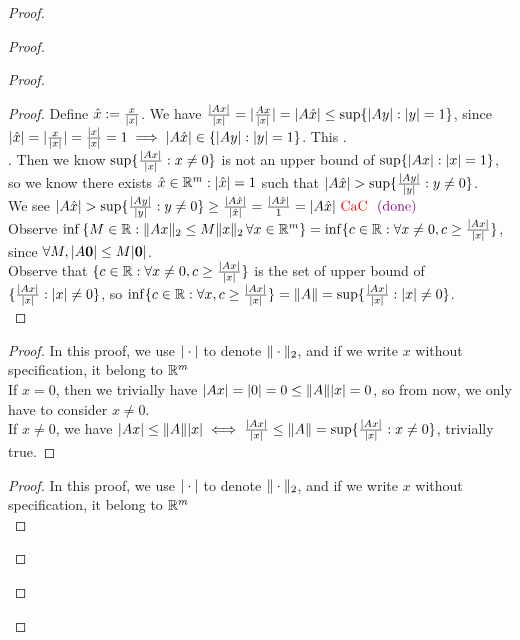 \documentclass{report}
\begin{document}
\begin{proof}
\begin{proof}
\begin{proof}
\begin{proof}
Define $\hat{x}:=\frac{x}{|x|}$. We have $\frac{|Ax|}{|x|}=|\frac{Ax}{|x|}|=|A \hat{x}|\leq \sup \{ |Ay|:|y|=1 \}
$, since $|\hat{x}|=|\frac{x}{|x|}|=\frac{|x|}{|x|}=1\implies |A \hat{x}|\in \{ |Ay|:|y|=1 \}$. This \CaC.\\

. Then we know $\sup \{ \frac{|Ax|}{|x|}:x\neq 0 \}$ is not an upper bound of $\sup \{ |Ax|:|x|=1 \}$, so we know there exists $\hat{x} \in \mathbb{R}^m:|\hat{x}|=1$ such that $\abso{A \hat{x}}>\sup \set{\frac{\abso{Ay}}{\abso{y}}:y\neq 0}$.\\

We see $\abso{A \hat{x}}>\sup \set{\frac{\abso{Ay}}{\abso{y}}:y\neq 0}\geq \frac{\abso{A \hat{x}}}{\abso{\hat{x}}}=\frac{\abso{A \hat{x}}}{1}=\abso{A \hat{x}}\tCaC \vdone$\\

Observe $  \inf \left\{ M \in \mathbb{R} : \|Ax\|_2 \leq M \|x\|_2 \, \forall x \in \mathbb{R}^m \right\}= \inf \{ c \in \mathbb{R}: \forall x\neq 0, c\geq \frac{|Ax|}{|x|} \}$, since $\forall M, |A\textbf{0}|\leq M|\textbf{0}|$.\\

Observe that $   \{ c \in \mathbb{R}: \forall x\neq 0, c\geq \frac{|Ax|}{|x|} \}$ is the set of upper bound of $\{ \frac{|Ax|}{|x|}:|x|\neq 0 \}$, so $\inf   \{ c \in \mathbb{R}: \forall x, c\geq \frac{|Ax|}{|x|} \}=\| A \|=\sup \{ \frac{|Ax|}{|x|}:|x|\neq 0 \}$.\\
\end{proof}
\begin{proof}
In this proof, we use $|\cdot|$ to denote $\| \cdot \|_2$, and if we write $x$ without specification, it belong to  $\mathbb{R}^m$\\

If $x=0$, then we trivially have  $|Ax|=|0|=0\leq \| A \||x|=0$, so from now, we only have to consider $x\neq 0$.\\

If $x\neq 0$, we have $|Ax|\leq \| A \||x|\iff \frac{|Ax|}{|x|}\leq \| A \|=\sup \{ \frac{|Ax|}{|x|}:x\neq 0 \}$, trivially true.
\end{proof}
\begin{proof}
In this proof, we use $|\cdot|$ to denote $\| \cdot \|_2$, and if we write $x$ without specification, it belong to  $\mathbb{R}^m$\\


\end{proof}
\end{proof}
\end{proof}
\end{proof}
\end{document}
